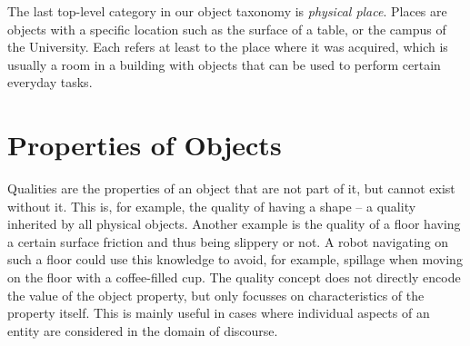 The last top-level category in our object taxonomy is \emph{physical place}.
Places are objects with a specific location such as the surface of a table, or the campus of the University.
Each \neem refers at least to the place where it was acquired, which is usually a room in a building with objects that can be used to perform certain everyday tasks.



\section{Properties of Objects}
\label{sec:background:properties}

Qualities are the properties of an object that are not part of it, but cannot exist without it.
This is, for example, the quality of having a shape -- a quality inherited by all physical objects.
Another example is the quality of a floor having a certain surface friction and thus being slippery or not.
A robot navigating on such a floor could use this knowledge to avoid, for example,
spillage when moving on the floor with a coffee-filled cup.
The quality concept does not directly encode the value of the object property, but only focusses on characteristics of the property itself.
This is mainly useful in cases where individual aspects of an entity are considered in the domain of discourse.

